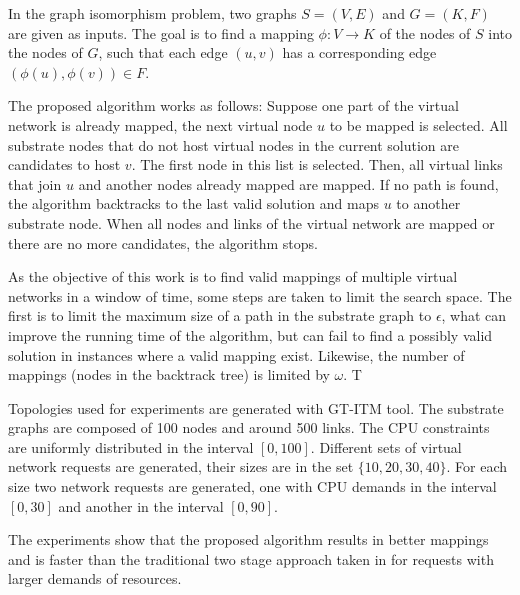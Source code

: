In the graph isomorphism problem, two graphs $S=(V,E)$ and $G=(K,F)$ are given as inputs. The goal is to find a mapping $\phi : V \rightarrow K$  of the nodes of $S$ into the nodes of $G$, such that each edge $(u,v)$ has a corresponding edge  $(\phi(u), \phi(v)) \in  F$.

The proposed algorithm works as follows: Suppose one part of the virtual network is already mapped, the next virtual node $u$ to be mapped is selected. All substrate nodes that do not host virtual nodes in the current solution are candidates to host $v$. The first node in this list is selected. Then, all virtual links that join $u$ and another nodes already mapped are mapped. If no path is found, the algorithm backtracks to the last valid solution and maps $u$ to another substrate node. When all nodes and links of the virtual network are mapped or there are no more candidates, the algorithm stops.

As the objective of this work is to find valid mappings of multiple virtual networks in a window of time, some steps are taken to limit the search space. The first is to limit the maximum size of a path in the substrate graph to $\epsilon$, what can improve the running time of the algorithm, but can fail to find a possibly valid solution in instances where a valid mapping exist. Likewise, the number of mappings (nodes in the backtrack tree) is limited by $\omega$. T

Topologies used for experiments are generated with GT-ITM tool. The substrate graphs are composed of 100 nodes and around 500 links. The CPU constraints are uniformly distributed in the interval $[0,100]$. Different sets of virtual network requests are generated, their sizes are in the set $\{10,20,30,40\}$. For each size two network requests are generated, one with CPU demands in the interval $[0,30]$ and another in the interval $[0,90]$.

The experiments show that the proposed algorithm results in better mappings and is faster than the traditional two stage approach taken in \cite{Yu2008} for requests with larger demands of resources.


